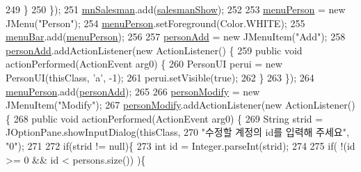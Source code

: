 \begin{DoxyCode}
249             \}
250         \});
251         \hyperlink{classpkg_1_1_management_u_i_a240bf0c46a930b09db9d727ce86c6ec7}{mnSalesman}.add(\hyperlink{classpkg_1_1_management_u_i_ad1d6b0d565e4379362dbb7f4071614a9}{salesmanShow});
252         
253         \hyperlink{classpkg_1_1_management_u_i_aac445016414136b78a968311480e8308}{menuPerson} = \textcolor{keyword}{new} JMenu(\textcolor{stringliteral}{"Person"});
254         \hyperlink{classpkg_1_1_management_u_i_aac445016414136b78a968311480e8308}{menuPerson}.setForeground(Color.WHITE);
255         \hyperlink{classpkg_1_1_management_u_i_ace9ff91bcebb641b7363e764eae00310}{menuBar}.add(\hyperlink{classpkg_1_1_management_u_i_aac445016414136b78a968311480e8308}{menuPerson});
256         
257         \hyperlink{classpkg_1_1_management_u_i_a4781978da9cf1df76dde465ccdadc9f7}{personAdd} = \textcolor{keyword}{new} JMenuItem(\textcolor{stringliteral}{"Add"});
258         \hyperlink{classpkg_1_1_management_u_i_a4781978da9cf1df76dde465ccdadc9f7}{personAdd}.addActionListener(\textcolor{keyword}{new} ActionListener() \{
259             \textcolor{keyword}{public} \textcolor{keywordtype}{void} actionPerformed(ActionEvent arg0) \{
260                 PersonUI perui = \textcolor{keyword}{new} PersonUI(thisClass, \textcolor{charliteral}{'a'}, -1);
261                 perui.setVisible(\textcolor{keyword}{true});
262             \}
263         \});
264         \hyperlink{classpkg_1_1_management_u_i_aac445016414136b78a968311480e8308}{menuPerson}.add(\hyperlink{classpkg_1_1_management_u_i_a4781978da9cf1df76dde465ccdadc9f7}{personAdd});
265         
266         \hyperlink{classpkg_1_1_management_u_i_aadf201377400033cf5739556137eca44}{personModify} = \textcolor{keyword}{new} JMenuItem(\textcolor{stringliteral}{"Modify"});
267         \hyperlink{classpkg_1_1_management_u_i_aadf201377400033cf5739556137eca44}{personModify}.addActionListener(\textcolor{keyword}{new} ActionListener() \{
268             \textcolor{keyword}{public} \textcolor{keywordtype}{void} actionPerformed(ActionEvent arg0) \{
269                 String strid = JOptionPane.showInputDialog(thisClass,
270                         \textcolor{stringliteral}{"수정할 계정의 id를 입력해 주세요"}, \textcolor{stringliteral}{"0"});
271                 
272                 \textcolor{keywordflow}{if}(strid != null)\{
273                     \textcolor{keywordtype}{int} \textcolor{keywordtype}{id} = Integer.parseInt(strid);
274                     
275                     \textcolor{keywordflow}{if}( !(\textcolor{keywordtype}{id} >= 0 && \textcolor{keywordtype}{id} < persons.size()) )\{

\end{DoxyCode}
